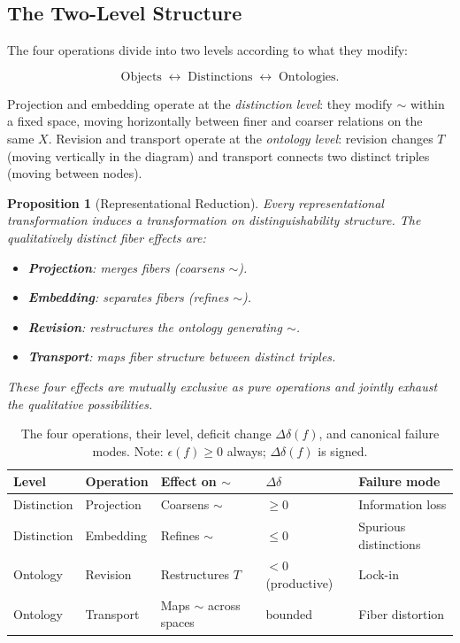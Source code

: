 \documentclass[12pt, a4paper]{article}
\theoremstyle{plain}
\newtheorem{proposition}[theorem]{Proposition}
\theoremstyle{definition}
\theoremstyle{remark}
\newcommand{\Ddelta}{\Delta\delta}
\newcommand{\eps}{\epsilon}
\begin{document}
\subsection{The Two-Level Structure}

The four operations divide into two levels according to what they modify:

\[
  \text{Objects} \;\longleftrightarrow\; \text{Distinctions}
  \;\longleftrightarrow\; \text{Ontologies}.
\]

Projection and embedding operate at the \emph{distinction level}: they
modify $\sim$ within a fixed space, moving horizontally between finer and
coarser relations on the same $X$. Revision and transport operate at the
\emph{ontology level}: revision changes $T$ (moving vertically in the diagram)
and transport connects two distinct triples (moving between nodes).

\begin{proposition}[Representational Reduction]
\label{prop:rep-reduction}
Every representational transformation induces a transformation on
distinguishability structure. The qualitatively distinct fiber effects are:
\begin{itemize}[leftmargin=1.8em]
  \item \textbf{Projection}: merges fibers (coarsens $\sim$).
  \item \textbf{Embedding}: separates fibers (refines $\sim$).
  \item \textbf{Revision}: restructures the ontology generating $\sim$.
  \item \textbf{Transport}: maps fiber structure between distinct triples.
\end{itemize}
These four effects are mutually exclusive as pure operations and jointly
exhaust the qualitative possibilities.
\end{proposition}

\begin{table}[h]
\centering
\renewcommand{\arraystretch}{1.35}
\begin{tabular}{lllll}
\toprule
\textbf{Level} & \textbf{Operation} & \textbf{Effect on $\sim$}
  & $\Ddelta$ & \textbf{Failure mode} \\
\midrule
Distinction & Projection  & Coarsens $\sim$           & $\ge 0$ & Information loss \\
Distinction & Embedding   & Refines $\sim$            & $\le 0$ & Spurious distinctions \\
Ontology    & Revision    & Restructures $T$          & $<0$ (productive) & Lock-in \\
Ontology    & Transport   & Maps $\sim$ across spaces & bounded & Fiber distortion \\
\bottomrule
\end{tabular}
\caption{The four operations, their level, deficit change $\Ddelta(f)$,
and canonical failure modes. Note: $\eps(f)\ge 0$ always; $\Ddelta(f)$
is signed.}
\label{tab:ops}
\end{table}
\end{document}
